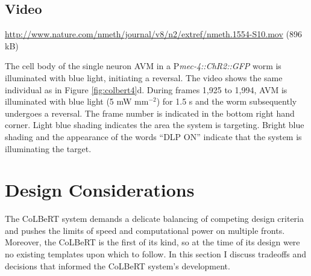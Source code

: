\subsection{Video}\label{movie:colbert9} %
\url{http://www.nature.com/nmeth/journal/v8/n2/extref/nmeth.1554-S10.mov} (896 kB)

The cell body of the single neuron AVM in a P\textit{mec-4::ChR2::GFP} worm is illuminated with blue light, initiating a reversal. The video shows the same individual as in Figure \ref{fig:colbert4}d. During frames 1,925 to 1,994, AVM is illuminated with blue light (5 mW mm$^{−2}$) for 1.5 s and the worm subsequently undergoes a reversal. The frame number is indicated in the bottom right hand corner. Light blue shading indicates the area the system is targeting. Bright blue shading and the appearance of the words “DLP ON” indicate that the system is illuminating the target.


\section{Design Considerations}
The CoLBeRT system demands a delicate balancing of competing design criteria and pushes the limits of speed and computational power on multiple fronts. Moreover, the CoLBeRT is the first of its kind, so at the time of its design were no existing templates upon which to follow.  In this section I discuss tradeoffs and  decisions that informed the CoLBeRT system's development.

